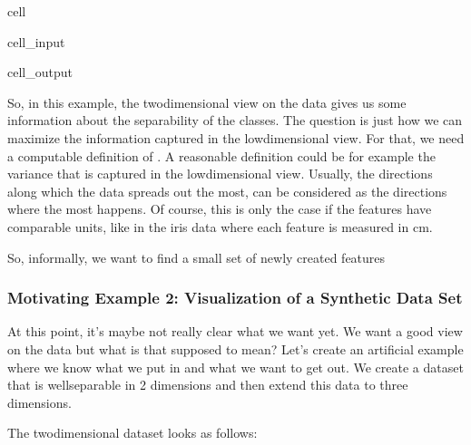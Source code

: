 \documentclass[letterpaper,10pt,english]{jupyterBook}
\begin{document}
\begin{sphinxuseclass}{cell}
\begin{sphinxVerbatimInput}
\begin{sphinxuseclass}{cell_input}
\end{sphinxuseclass}\end{sphinxVerbatimInput}
\begin{sphinxVerbatimOutput}

\begin{sphinxuseclass}{cell_output}
\noindent{}

\end{sphinxuseclass}\end{sphinxVerbatimOutput}

\end{sphinxuseclass}
\sphinxAtStartPar
So, in this example, the two\sphinxhyphen{}dimensional view on the data gives us some information about the separability of the classes. The question is just how we can maximize the information captured in the low\sphinxhyphen{}dimensional view. For that, we need a computable definition of . A reasonable definition could be for example the variance that is captured in the low\sphinxhyphen{}dimensional view. Usually, the directions along which the data spreads out the most, can be considered as the directions where the most happens. Of course, this is only the case if the features have comparable units, like in the iris data where each feature is measured in cm.

\sphinxAtStartPar
So, informally, we want to find a small set of newly created features


\subsubsection{Motivating Example 2: Visualization of a Synthetic Data Set}
\label{\detokenize{dim_reduction_pca:motivating-example-2-visualization-of-a-synthetic-data-set}}
\sphinxAtStartPar
At this point, it’s maybe not really clear what we want yet. We want a good view on the data but what is that supposed to mean? Let’s create an artificial example where we know what we put in and what we want to get out. We create a dataset that is well\sphinxhyphen{}separable in 2 dimensions and then extend this data to three dimensions.

\sphinxAtStartPar
The two\sphinxhyphen{}dimensional dataset looks as follows:
\end{document}
